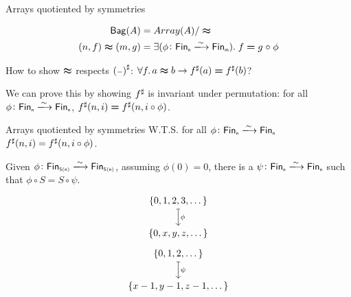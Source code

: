 \documentclass[9pt]{beamer}
\begin{document}
\begin{frame}[fragile]{Arrays quotiented by symmetries}
    \begin{dblock}
        \vspace{-0.4cm}
        \begin{align*}
            \type{Bag}(A) &= Array(A) / \reln
            \\
            (n,f) \reln (m,g) &= 
                \exis{\phi\colon \Fin[n]\xto{\sim}\Fin[m]}{f \id g \comp \phi}
        \end{align*}
    \end{dblock}
    How to show $\mathrel{\boldsymbol{\approx}}$ respects ${({\scriptstyle{-}})}^{\sharp}$: $\forall f. \, a \reln b \to \ext{f}(a) \id \ext{f}(b)$?

    We can prove this by showing ${f}^{\sharp}$ is \alert{invariant under permutation}: for all $\phi\colon \Fin[n]\xto{\sim}\Fin[n]$,
    $\ext{f}(n, i) \id \ext{f}(n, i \circ \phi)$.
    
\end{frame}

\begin{frame}[fragile]{Arrays quotiented by symmetries}
    W.T.S. for all $\phi\colon \Fin[n]\xto{\sim}\Fin[n]$ ${f}^{\sharp}(n, i) = {f}^{\sharp}(n, i \circ \phi)$.

    \begin{tblock}
    Given $\phi\colon \Fin[S(n)]\xto{\sim}\Fin[S(n)]$, assuming $\phi(0) = 0$, there is a 
    $\psi\colon \Fin[n]\xto{\sim}\Fin[n]$ such that $\phi \circ S = S \circ \psi$.
   
    \[\begin{tikzcd}[ampersand replacement=\&,cramped]
    	{\{0, 1, 2, 3, \dots\}} \\
    	{ \{0, x, y, z, \dots\}}
        \arrow["\phi", maps to, from=1-1, to=2-1]
    \end{tikzcd}\]

    \[\begin{tikzcd}[ampersand replacement=\&,cramped]
    	{\{0, 1, 2, \dots\}} \\
    	{ \{x - 1, y - 1, z - 1, \dots\}}
        \arrow["\psi", maps to, from=1-1, to=2-1]
    \end{tikzcd}\]

    \end{tblock}
    
\end{frame}
\end{document}
